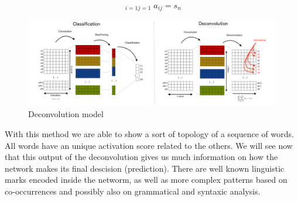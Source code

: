 \begin{equation}
\mathop{\sum^{x}\sum^{y}}_{i=1  j=1}  a_{ij} = s_{n}
\label{equation}
\end{equation}

\begin{figure}[h]
\begin{center}
\includegraphics[width=16cm]{img/model.png}
\caption{Deconvolution model}
\label{cnn}
\end{center}
\end{figure}

With this method we are able to show a sort of topology of a sequence of words. All words have an unique activation score related to the others. We will see now that this output of the deconvolution gives us much information on how the network makes its final descision (prediction). There are well known linguistic marks encoded inside the networm, as well as more complex patterns based on co-occurrences and possibly also on grammatical and syntaxic analysis.
